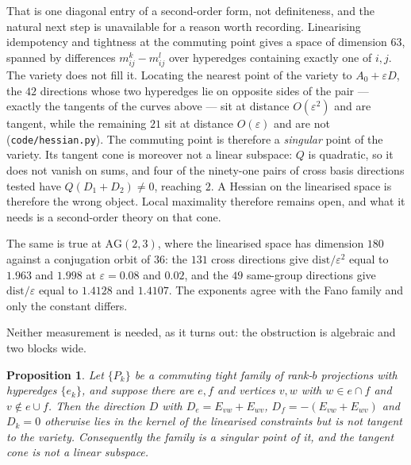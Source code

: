 \documentclass[11pt]{article}
\newtheorem{proposition}[theorem]{Proposition}
\theoremstyle{remark}
\begin{document}
That is one diagonal entry of a second-order form, not definiteness, and the natural next step is
unavailable for a reason worth recording. Linearising idempotency and tightness at the commuting
point gives a space of dimension $63$, spanned by differences $m^k_{ij}-m^l_{ij}$ over hyperedges
containing exactly one of $i,j$. The variety does not fill it. Locating the nearest point of the
variety to $A_0+\varepsilon D$, the $42$ directions whose two hyperedges lie on opposite sides of
the pair --- exactly the tangents of the curves above --- sit at distance $O(\varepsilon^2)$ and
are tangent, while the remaining $21$ sit at distance $O(\varepsilon)$ and are not
(\texttt{code/hessian.py}). The commuting point is therefore a \emph{singular} point of the
variety. Its tangent cone is moreover not a linear subspace: $Q$ is quadratic, so it does not
vanish on sums, and four of the ninety-one pairs of cross basis directions tested have
$Q(D_1+D_2)\neq0$, reaching $2$. A Hessian on the linearised space is therefore the wrong
object. Local maximality therefore remains open, and what it needs is a second-order theory
on that cone.

The same is true at $\mathrm{AG}(2,3)$, where the linearised space has dimension $180$ against a
conjugation orbit of $36$: the $131$ cross directions give $\mathrm{dist}/\varepsilon^2$ equal to
$1.963$ and $1.998$ at $\varepsilon=0.08$ and $0.02$, and the $49$ same-group directions give
$\mathrm{dist}/\varepsilon$ equal to $1.4128$ and $1.4107$. The exponents agree with the Fano
family and only the constant differs.

Neither measurement is needed, as it turns out: the obstruction is algebraic and two blocks wide.

\begin{proposition}\label{prop:singular}
Let $\{P_k\}$ be a commuting tight family of rank-$b$ projections with hyperedges $\{e_k\}$, and
suppose there are $e,f$ and vertices $v,w$ with $w\in e\cap f$ and $v\notin e\cup f$. Then the
direction $D$ with $D_e=E_{vw}+E_{wv}$, $D_f=-(E_{vw}+E_{wv})$ and $D_k=0$ otherwise lies in the
kernel of the linearised constraints but is not tangent to the variety. Consequently the family is
a singular point of it, and the tangent cone is not a linear subspace.
\end{proposition}
\end{document}
